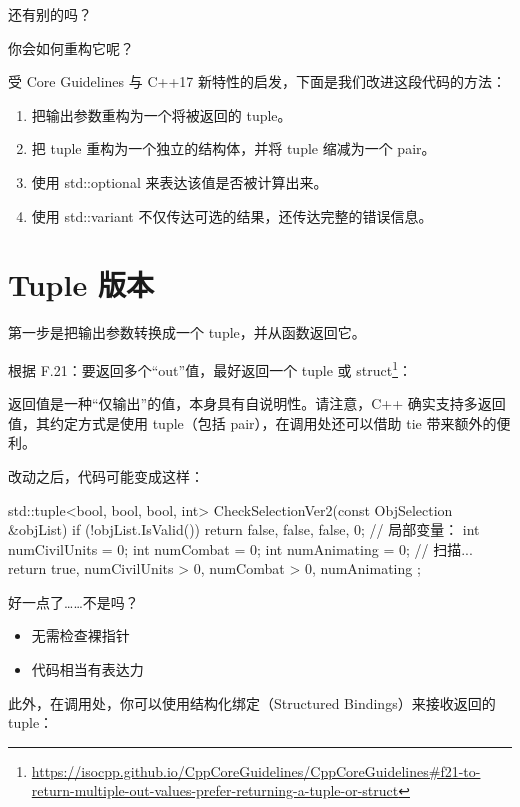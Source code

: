 还有别的吗？

你会如何重构它呢？

受 Core Guidelines 与 C++17 新特性的启发，下面是我们改进这段代码的方法：

\begin{enumerate}
\item 把输出参数重构为一个将被返回的 tuple。
\item 把 tuple 重构为一个独立的结构体，并将 tuple 缩减为一个 pair。
\item 使用 std::optional 来表达该值是否被计算出来。
\item 使用 std::variant 不仅传达可选的结果，还传达完整的错误信息。
\end{enumerate}

\section{Tuple 版本}

第一步是把输出参数转换成一个 tuple，并从函数返回它。

根据 F.21：要返回多个“out”值，最好返回一个 tuple 或 struct\footnote{\url{https://isocpp.github.io/CppCoreGuidelines/CppCoreGuidelines\#f21-to-return-multiple-out-values-prefer-returning-a-tuple-or-struct}}：

\begin{myQuote}
返回值是一种“仅输出”的值，本身具有自说明性。请注意，C++ 确实支持多返回值，其约定方式是使用 tuple（包括 pair），在调用处还可以借助 tie 带来额外的便利。
\end{myQuote}

改动之后，代码可能变成这样：

\begin{codebox}[cpp]
std::tuple<bool, bool, bool, int>
CheckSelectionVer2(const ObjSelection &objList)
{
    if (!objList.IsValid())
        return {false, false, false, 0};
    // 局部变量：
    int numCivilUnits = 0;
    int numCombat = 0;
    int numAnimating = 0;
    // 扫描...
    return {true, numCivilUnits > 0, numCombat > 0, numAnimating };
}
\end{codebox}

好一点了……不是吗？

\begin{itemize}
\item 无需检查裸指针
\item 代码相当有表达力
\end{itemize}

此外，在调用处，你可以使用结构化绑定（Structured Bindings）来接收返回的 tuple：

